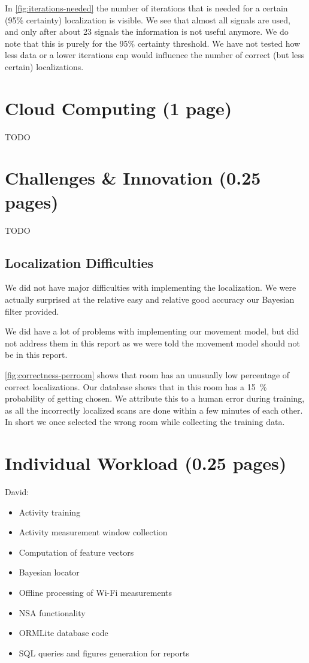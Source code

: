 \documentclass[a4paper,10pt,twoside]{IEEEtran}
\begin{document}
In \autoref{fig:iterations-needed} the number of iterations that is needed for a certain (95\% certainty) localization is visible.
We see that almost all signals are used, and only after about 23 signals the information is not useful anymore.
We do note that this is purely for the 95\% certainty threshold.
We have not tested how less data or a lower iterations cap would influence the number of correct (but less certain) localizations.

\section{Cloud Computing (1 page)}
\label{sec:cloud-computing}
TODO

\section{Challenges \& Innovation (0.25 pages)}
\label{sec:innovation}
TODO

\subsection{Localization Difficulties}

We did not have major difficulties with implementing the localization.
We were actually surprised at the relative easy and relative good accuracy our Bayesian filter provided.

We did have a lot of problems with implementing our movement model, but did not address them in this report as we were told the movement model should not be in this report.

\autoref{fig:correctness-perroom} shows that room  has an unusually low percentage of correct localizations. Our database shows that in this room  has a 15~\% probability of getting chosen.
We attribute this to a human error during training, as all the incorrectly localized scans are done within a few minutes of each other.
In short we once selected the wrong room while collecting the training data.

\section{Individual Workload (0.25 pages)}
\label{sec:individual-workload}
David:
\begin{itemize}
    \item Activity training
    \item Activity measurement window collection
    \item Computation of feature vectors
    \item Bayesian locator
    \item Offline processing of Wi-Fi measurements
    \item NSA functionality
    \item ORMLite database code
    \item SQL queries and figures generation for reports
\end{itemize}
\end{document}
